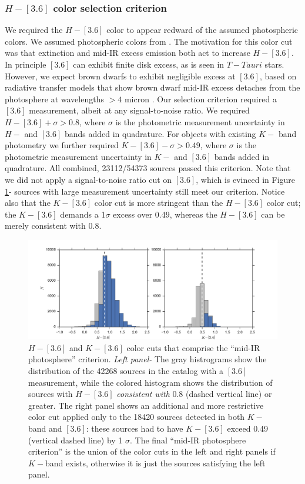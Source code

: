 \subsubsection{$H-[3.6]$ color selection criterion}
We required the $H-[3.6]$ color to appear redward of the assumed photospheric colors.  We assumed photospheric colors from \citet{2006ApJ...651..502P}.  The motivation for this color cut was that extinction and mid-IR excess emission both act to increase $H-[3.6]$.  In principle $[3.6]$ can exhibit finite disk excess, as is seen in $T-Tauri$ stars.  However, we expect brown dwarfs to exhibit negligible excess at $[3.6]$, based on radiative transfer models that show brown dwarf mid-IR excess detaches from the photosphere at wavelengths $>4$ micron \citep{2009MNRAS.394L.141E}.  Our selection criterion required a $[3.6]$ measurement, albeit at any signal-to-noise ratio.  We required $H-[3.6] + \sigma > 0.8$, where $\sigma$ is the photometric measurement uncertainty in $H-$ and $[3.6]$ bands added in quadrature.  For objects with existing $K-$ band photometry we further required $K-[3.6] - \sigma > 0.49$, where $\sigma$ is the photometric measurement uncertainty in $K-$ and $[3.6]$ bands added in quadrature.  All combined, 23112/54373 sources passed this criterion.  Note that we did not apply a signal-to-noise ratio cut on $[3.6]$, which is evinced in Figure \ref{fig_midIR_phot_sel}- sources with large measurement uncertainty still meet our criterion.  Notice also that the $K-[3.6]$ color cut is more stringent than the $H-[3.6]$ color cut; the $K-[3.6]$ demands a 1$\sigma$ excess over 0.49, whereas the $H-[3.6]$ can be merely consistent with 0.8.

\begin{figure}[ht!]
  \caption[Mid-infrared photospheric emission selection]{$H-[3.6]$ and $K-[3.6]$ color cuts that comprise the ``mid-IR photosphere'' criterion.  \emph{Left panel-} The gray histrograms show the distribution of the 42268 sources in the catalog with a $[3.6]$ measurement, while the colored histogram shows the distribution of sources with $H-[3.6]$ \emph{consistent with} 0.8 (dashed vertical line) or greater.  The right panel shows an additional and more restrictive color cut applied only to the 18420 sources detected in both $K-$ band and $[3.6]$: these sources had to have $K-[3.6]$ exceed 0.49 (vertical dashed line) by 1 $\sigma$.  The final ``mid-IR photosphere criterion'' is the union of the color cuts in the left and right panels if $K-$band exists, otherwise it is just the sources satisfying the left panel.  \label{fig_midIR_phot_sel}}
\centering
\includegraphics[scale=0.6]{chIMACS/figures/midIR_phot_sel}
\end{figure}

